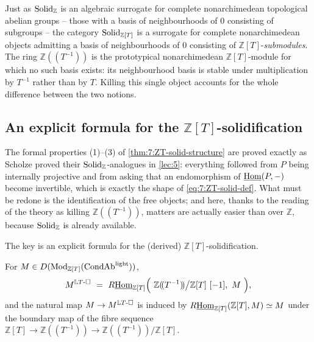 \begin{remark}
\label{rmk:7:nonarch-interpretation}
Just as $\mathrm{Solid}_{\mathbb{Z}}$ is an algebraic surrogate for complete
nonarchimedean topological abelian groups -- those with a basis of
neighbourhoods of $0$ consisting of subgroups -- the category
$\mathrm{Solid}_{\mathbb{Z}[T]}$ is a surrogate for complete nonarchimedean objects
admitting a basis of neighbourhoods of $0$ consisting of
$\mathbb{Z}[T]$-\emph{submodules}. The ring $\mathbb{Z}(\!(T^{-1})\!)$ is the
prototypical nonarchimedean $\mathbb{Z}[T]$-module for which no such basis
exists: its neighbourhood basis is stable under multiplication by $T^{-1}$
rather than by $T$. Killing this single object accounts for the whole
difference between the two notions.
\end{remark}

\subsection{An explicit formula for the
\texorpdfstring{$\mathbb{Z}[T]$}{Z[T]}-solidification}

The formal properties (1)--(3) of \cref{thm:7:ZT-solid-structure} are proved
exactly as Scholze proved their $\mathrm{Solid}_{\mathbb{Z}}$-analogues in
\cref{lec:5}: everything followed from $P$ being internally projective and from
asking that an endomorphism of $\underline{\operatorname{Hom}}(P,-)$ become invertible, which is exactly
the shape of \eqref{eq:7:ZT-solid-def}. What must be redone is the
identification of the free objects; and here, thanks to the reading of the
theory as killing $\mathbb{Z}(\!(T^{-1})\!)$, matters are actually easier than
over $\mathbb{Z}$, because $\mathrm{Solid}_{\mathbb{Z}}$ is already available.

The key is an explicit formula for the (derived) $\mathbb{Z}[T]$-solidification.

\begin{proposition}
\label{prop:7:solidification-formula}
For $M\in D(\mathrm{Mod}_{\mathbb{Z}[T]}(\mathrm{CondAb}^{\mathrm{light}}))$,
\begin{equation}
\label{eq:7:solidification-formula}
M^{\mathbb{L}T\text{-}\square}\ =\ R\underline{\operatorname{Hom}}_{\mathbb{Z}[T]}\Bigl(\
\mathbb{Z}(\!(T^{-1})\!)\big/\mathbb{Z}[T]\ [-1],\ M\ \Bigr),
\end{equation}
and the natural map $M\to M^{\mathbb{L}T\text{-}\square}$ is induced by
$R\underline{\operatorname{Hom}}_{\mathbb{Z}[T]}(\mathbb{Z}[T],M)\simeq M$ under the boundary map of the
fibre sequence $\mathbb{Z}[T]\to\mathbb{Z}(\!(T^{-1})\!)\to
\mathbb{Z}(\!(T^{-1})\!)/\mathbb{Z}[T]$.
\end{proposition}

